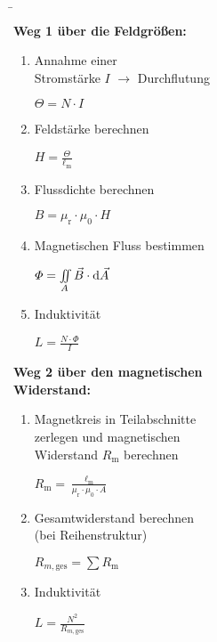 \begin{frame}
{\begin{minipage}{0.49 \textwidth}
	\end{minipage}
}
\b{
		\begin{minipage}{0.49\textwidth}
			\vspace*{20pt}
			\textbf{Weg 1 über die Feldgrößen:}
			\begin{enumerate}%
				\item Annahme einer \\ Stromstärke $I$ $\rightarrow$ Durchflutung \par $\Theta = N\cdot I$
				\item Feldstärke berechnen \par $H=\frac{\Theta}{\ell_{\mathrm{m}}}$
				\item Flussdichte berechnen \par $B=\mu_{\mathrm{r}}\cdot\mu_0\cdot H$
				\item Magnetischen Fluss bestimmen \par $\varPhi = \iint\limits_A \vec{B}\cdot \mathrm{d} \vec{A}$
				\item Induktivität \par $L=\frac{N\cdot \varPhi}{I}$\\
			\end{enumerate}
		\end{minipage}
	 \pause
		\begin{minipage}{0.49 \textwidth}
			\vspace*{-30pt}
			\textbf{Weg 2 über den magnetischen \\ Widerstand:}
			\begin{enumerate}%
				\item Magnetkreis in Teilabschnitte \\ zerlegen und magnetischen \\ Widerstand $R_{\mathrm{m}}$ berechnen \par $R_{\mathrm{m}}=\frac{\ell_{\mathrm{m}}}{\mu_{\mathrm{r}}\cdot\mu_0\cdot A}$
				\item Gesamtwiderstand berechnen\\(bei Reihenstruktur) \par $R_{m,\mathrm{ges}} = \sum R_{\mathrm{m}}$
				\item Induktivität \par $L=\frac{N^2}{R_{m,\mathrm{ges}}}$
			\end{enumerate}
		\end{minipage}
}
\end{frame}


